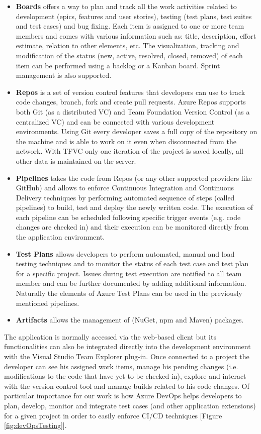 \begin{itemize}
    \item \textbf{Boards} offers a way to plan and track all the work activities related to development (epics, features and user stories), testing (test plans, test suites and test cases) and bug fixing. Each item is assigned to one or more team members and comes with various information such as: title, description, effort estimate, relation to other elements, etc. The visualization, tracking and modification of the status (new, active, resolved, closed, removed) of each item can be performed using a backlog or a Kanban board. Sprint management is also supported.
    \item \textbf{Repos} is a set of version control features that developers can use to track code changes, branch, fork and create pull requests. Azure Repos supports both Git (as a distributed VC) and Team Foundation Version Control (as a centralized VC) and can be connected with various development environments. Using Git every developer saves a full copy of the repository on the machine and is able to work on it even when disconnected from the network. With TFVC only one iteration of the project is saved locally, all other data is maintained on the server.
    \item \textbf{Pipelines} takes the code from Repos (or any other supported providers like GitHub) and allows to enforce Continuous Integration and Continuous Delivery techniques by performing automated sequence of steps (called pipelines) to build, test and deploy the newly written code. The execution of each pipeline can be scheduled following specific trigger events (e.g. code changes are checked in) and their execution can be monitored directly from the application environment.
    \item \textbf{Test Plans} allows developers to perform automated, manual and load testing techniques and to monitor the status of each test case and test plan for a specific project. Issues during test execution are notified to all team member and can be further documented by adding additional information. Naturally the elements of Azure Test Plans can be used in the previously mentioned pipelines.
    \item \textbf{Artifacts} allows the management of (NuGet, npm and Maven) packages.
\end{itemize}

The application is normally accessed via the web-based client but its functionalities can also be integrated directly into the development environment with the Visual Studio Team Explorer plug-in. Once connected to a project the developer can see his assigned work items, manage his pending changes (i.e. modifications to the code that have yet to be checked in), explore and interact with the version control tool and manage builds related to his code changes. Of particular importance for our work is how Azure DevOps helps developers to plan, develop, monitor and integrate test cases (and other application extensions) for a given project in order to easily enforce CI/CD techniques [Figure \ref{fig:devOpsTesting}].

